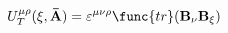 \begin{equation}
U_{T}^{\mu \rho }(\xi ,{\bf \bar{A}})=\varepsilon ^{\mu \nu \rho }\func{tr}(%
{\bf B}_{\nu }{\bf B}_{\xi })
\end{equation}

